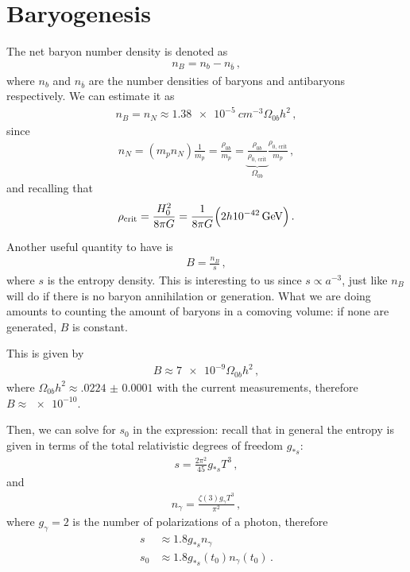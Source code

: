 \documentclass[main.tex]{subfiles}
\begin{document}
\chapter{Baryogenesis}


The net baryon number density is denoted as 
%
\begin{align}
n_B = n_b - n_{\overline{b}}
\,,
\end{align}
%
where \(n_b\) and \(n_{\overline{b}}\) are the number densities of baryons and antibaryons respectively. 
We can estimate it as 
%
\begin{align}
n_B = n_N \approx \SI{1.38e-5}{cm^{-3}} \Omega_{0b} h^2
\,,
\end{align}
%
since
%
\begin{align}
n_N = (m_p n_N) \frac{1}{m_p} = \frac{\rho_{0b}}{m_p} 
= \underbrace{\frac{\rho_{0b}}{\rho _{\text{0, crit}}}}_{\Omega_{0b}} \frac{\rho _{\text{0, crit}}}{m_p}
\,,
\end{align}
%
and recalling that 
%
\begin{align}
\rho _{\text{crit}} = \frac{H_0^2}{8 \pi G} = \frac{1}{8 \pi G} \qty(2 h \SI{e-42}{GeV} ) 
\,.
\end{align}

Another useful quantity to have is 
%
\begin{align}
B = \frac{n_B}{s}
\,,
\end{align}
%
where \(s\) is the entropy density.
This is interesting to us since \(s \propto a^{-3}\), just like \(n_B\) will do if there is no baryon annihilation or generation. 
What we are doing amounts to counting the amount of baryons in a comoving volume: if none are generated, \(B\) is constant. 

This is given by 
%
\begin{align}
B \approx \num{7e-9} \Omega_{0b} h^2
\,,
\end{align}
%
where \(\Omega_{0b} h^2 \approx \num{.0224(1)}\) with the current measurements, therefore \(B \approx \num{e-10}\).
    
Then, we can solve for \(s_0 \) in the expression: recall that in general
the entropy is given in terms of the total relativistic degrees of freedom \(g_{*s}\):
%
\begin{align}
s = \frac{2 \pi^2}{45} g_{*s} T^3
\,,
\end{align}
%
and 
%
\begin{align}
n_\gamma = \frac{\zeta (3) g_\gamma T^3}{\pi^2}
\,,
\end{align}
%
where \(g_\gamma = 2\) is the number of polarizations of a photon, therefore 
%
\begin{align} \label{eq:entropy-approximate}
s &\approx \num{1.8} g_{*s} n_\gamma  \\
s_0 &\approx \num{1.8} g_{*s}(t_0 ) n_\gamma (t_0 )
\,.
\end{align}
\end{document}
